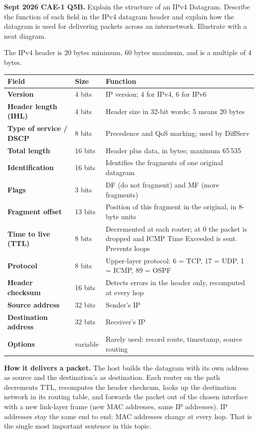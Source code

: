 \documentclass[11pt,a4paper]{article}
\begin{document}
\begin{pyqbox}
\textbf{Sept 2026 CAE-1 Q5B.} Explain the structure of an IPv4 Datagram. Describe the function of each field in the IPv4 datagram header and explain how the datagram is used for delivering packets across an internetwork. Illustrate with a neat diagram.
\end{pyqbox}

\begin{solbox}
The IPv4 header is 20 bytes minimum, 60 bytes maximum, and is a multiple of 4 bytes.

\begin{center}\small
\begin{tabularx}{\textwidth}{>{\bfseries}p{} p{} X}
\toprule Field & Size & Function\\
\midrule
Version & 4 bits & IP version; 4 for IPv4, 6 for IPv6\\
Header length (IHL) & 4 bits & Header size in 32-bit words; 5 means 20 bytes\\
Type of service / DSCP & 8 bits & Precedence and QoS marking; used by DiffServ\\
Total length & 16 bits & Header plus data, in bytes; maximum 65\,535\\
Identification & 16 bits & Identifies the fragments of one original datagram\\
Flags & 3 bits & DF (do not fragment) and MF (more fragments)\\
Fragment offset & 13 bits & Position of this fragment in the original, in 8-byte units\\
Time to live (TTL) & 8 bits & Decremented at each router; at 0 the packet is dropped and ICMP Time Exceeded is sent. Prevents loops\\
Protocol & 8 bits & Upper-layer protocol: 6 = TCP, 17 = UDP, 1 = ICMP, 89 = OSPF\\
Header checksum & 16 bits & Detects errors in the header only, recomputed at every hop\\
Source address & 32 bits & Sender's IP\\
Destination address & 32 bits & Receiver's IP\\
Options & variable & Rarely used: record route, timestamp, source routing\\
\bottomrule
\end{tabularx}
\end{center}

\textbf{How it delivers a packet.} The host builds the datagram with its own address as source and the destination's as destination. Each router on the path decrements TTL, recomputes the header checksum, looks up the destination network in its routing table, and forwards the packet out of the chosen interface with a new link-layer frame (new MAC addresses, same IP addresses). IP addresses stay the same end to end; MAC addresses change at every hop. That is the single most important sentence in this topic.
\end{solbox}
\end{document}
